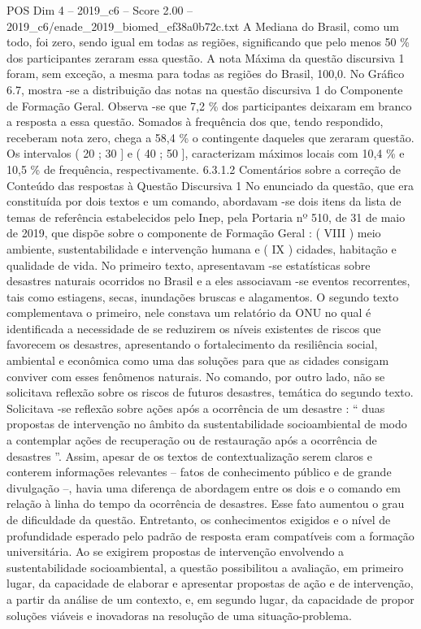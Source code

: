 \begin{textsample}{POS Dim 4 – 2019\_c6 – Score 2.00 – 2019\_c6/enade\_2019\_biomed\_ef38a0b72c.txt}
A Mediana do Brasil, como um todo, foi zero, sendo igual em todas as regiões, significando que pelo menos 50 \% dos participantes zeraram essa questão.
A nota Máxima da questão discursiva 1 foram, sem exceção, a mesma para todas as regiões do Brasil, 100,0.
No Gráfico 6.7, mostra -se a distribuição das notas na questão discursiva 1 do Componente de Formação Geral.
Observa -se que 7,2 \% dos participantes deixaram em branco a resposta a essa questão.
Somados à frequência dos que, tendo respondido, receberam nota zero, chega a 58,4 \% o contingente daqueles que zeraram questão.
Os intervalos ( 20 ; 30 ] e ( 40 ; 50 ], caracterizam máximos locais com 10,4 \% e 10,5 \% de frequência, respectivamente. 6.3.1.2 Comentários sobre a correção de Conteúdo das respostas à Questão Discursiva 1 No enunciado da questão, que era constituída por dois textos e um comando, abordavam -se dois itens da lista de temas de referência estabelecidos pelo Inep, pela Portaria nº 510, de 31 de maio de 2019, que dispõe sobre o componente de Formação Geral : ( VIII ) meio ambiente, sustentabilidade e intervenção humana e ( IX ) cidades, habitação e qualidade de vida.
No primeiro texto, apresentavam -se estatísticas sobre desastres naturais ocorridos no Brasil e a eles associavam -se eventos recorrentes, tais como estiagens, secas, inundações bruscas e alagamentos.
O segundo texto complementava o primeiro, nele constava um relatório da ONU no qual é identificada a necessidade de se reduzirem os níveis existentes de riscos que favorecem os desastres, apresentando o fortalecimento da resiliência social, ambiental e econômica como uma das soluções para que as cidades consigam conviver com esses fenômenos naturais.
No comando, por outro lado, não se solicitava reflexão sobre os riscos de futuros desastres, temática do segundo texto.
Solicitava -se reflexão sobre ações após a ocorrência de um desastre : “ duas propostas de intervenção no âmbito da sustentabilidade socioambiental de modo a contemplar ações de recuperação ou de restauração após a ocorrência de desastres ”.
Assim, apesar de os textos de contextualização serem claros e conterem informações relevantes – fatos de conhecimento público e de grande divulgação –, havia uma diferença de abordagem entre os dois e o comando em relação à linha do tempo da ocorrência de desastres.
Esse fato aumentou o grau de dificuldade da questão.
Entretanto, os conhecimentos exigidos e o nível de profundidade esperado pelo padrão de resposta eram compatíveis com a formação universitária.
Ao se exigirem propostas de intervenção envolvendo a sustentabilidade socioambiental, a questão possibilitou a avaliação, em primeiro lugar, da capacidade de elaborar e apresentar propostas de ação e de intervenção, a partir da análise de um contexto, e, em segundo lugar, da capacidade de propor soluções viáveis e inovadoras na resolução de uma situação-problema.

\end{textsample}
